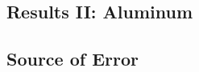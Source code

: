 \documentclass[a4paper]{article}
\begin{document}
\subsection{Results II: Aluminum}

\qq

\qq

\qq

\subsection{Source of Error}
\end{document}
